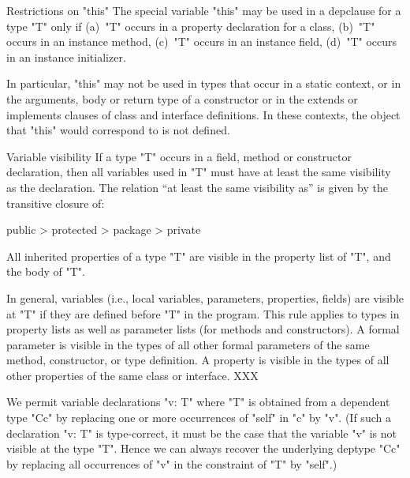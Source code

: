 \begin{staticrule}{Restrictions on \xcd"this"}
  The special variable \xcd"this" may be used in a depclause for a type \xcd"T"
  only if (a)~\xcd"T" occurs in a property declaration for a
  class, (b)~\xcd"T"
  occurs in an instance method, (c)~\xcd"T" occurs in an
  instance field, (d)~\xcd"T"
  occurs in an instance initializer.

  In particular, \xcd"this" may not be used in types that occur in a static
  context, or in the arguments, body or return type of a constructor or
  in the extends or implements clauses of class and interface
  definitions.  In these contexts, the object that \xcd"this" would
  correspond to is not defined.
\end{staticrule}

\begin{staticrule}{Variable visibility}
  If a type \xcd"T" occurs in a field, method or constructor
  declaration, then all variables used in \xcd"T" must have at least the
  same visibility as the declaration.  The relation ``at least the same
  visibility as'' is given by the transitive closure of:

\begin{xten}
public > protected > package > private
\end{xten}

All inherited properties of a type \xcd"T" are visible in the property
list of \xcd"T", and the body of \xcd"T".

\end{staticrule}

In general, variables (i.e., local variables, parameters,
properties, fields) are visible at
\xcd"T" if they are defined before \xcd"T" in the program. This rule applies to
types in property lists as well as parameter lists (for methods and
constructors).
A formal parameter is visible in the types of all other formal
parameters of the same method, constructor, or type definition.
A property is visible in the types of all other properties
of the same class or interface.
XXX

We permit variable declarations \xcd"v: T" where \xcd"T" is obtained
from a dependent type \xcd"C{c}" by replacing one or more occurrences
of \xcd"self" in \xcd"c" by \xcd"v". (If such a declaration \xcd"v: T"
is type-correct, it must be the case that the variable \xcd"v" is not
visible at the type \xcd"T". Hence we can always recover the
underlying deptype \xcd"C{c}" by replacing all occurrences of \xcd"v"
in the constraint of \xcd"T" by \xcd"self".)

